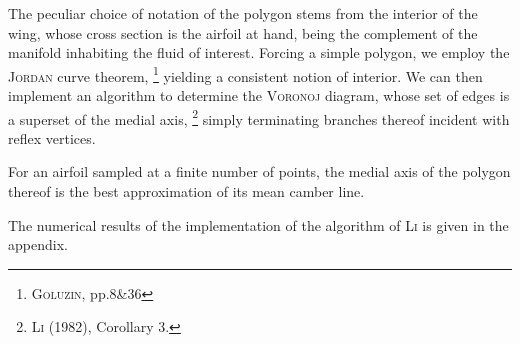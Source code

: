 \noindent
The peculiar choice of notation of the polygon stems from the interior of the wing, whose cross section is the airfoil at hand, being the complement of the manifold inhabiting the fluid of interest.
Forcing a simple polygon, we employ the \textsc{Jordan} curve theorem,%
\footnote{%
        \cite{goluzin1969geometric} \textsc{Goluzin}, pp.8\&36
}
yielding a consistent notion of interior.
We can then implement an algorithm to determine the \textsc{Voronoj} diagram, whose set of edges is a superset of the medial axis,%
\footnote{%
        \cite{li1982medial} \textsc{Li} (1982), Corollary 3.
}
simply terminating branches thereof incident with reflex vertices.

\begin{conjecture}\label{con:medial-axis}
        For an airfoil sampled at a finite number of points, the medial axis of the polygon thereof is the best approximation of its mean camber line.
\end{conjecture}

\noindent
The numerical results of the implementation of the algorithm of \textsc{Li} is given in the appendix.
